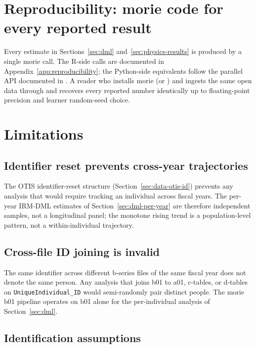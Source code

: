 \documentclass[article,shortnames,nojss]{jss}
\newcommand{\OTIS}{\textsf{OTIS}}
\begin{document}
\section{Reproducibility: morie code for every reported result}
\label{sec:reproducibility}

Every estimate in Sections~\ref{sec:dml} and~\ref{sec:physics-results} is produced by a single morie call. The R-side
calls are documented in Appendix~\ref{app:reproducibility}; the
Python-side equivalents follow the parallel API documented in
\citet{Ruhela2026MoriePy}. A reader who installs morie
 (or ) and
ingests the same open data through 
and  recovers every reported number
identically up to floating-point precision and learner random-seed
choice.

\section{Limitations}
\label{sec:limitations}

\subsection{Identifier reset prevents cross-year trajectories}

The \OTIS{} identifier-reset structure (Section~\ref{sec:data-otis-id})
prevents any analysis that would require tracking an individual
across fiscal years. The per-year IRM-DML estimates of
Section~\ref{sec:dml-per-year} are therefore independent samples,
not a longitudinal panel; the monotone rising trend is a
population-level pattern, not a within-individual trajectory.

\subsection{Cross-file ID joining is invalid}

The same identifier across different b-series files of the same
fiscal year does not denote the same person. Any analysis that
joins b01 to a01, c-tables, or d-tables on
\texttt{UniqueIndividual\_ID} would semi-randomly pair distinct
people. The morie b01 pipeline operates on b01 alone for the
per-individual analysis of Section~\ref{sec:dml}.

\subsection{Identification assumptions}
\end{document}
